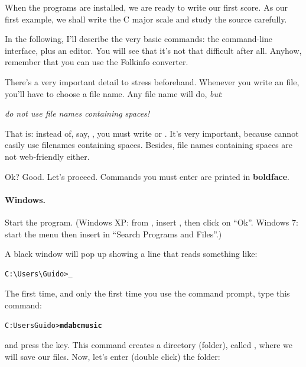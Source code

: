 \documentclass[a4paper,fullpage,12pt]{book}
\begin{document}
When the programs are installed, we are ready to write our first
score. As our first example, we shall write the C major scale and
study the source carefully.

In the following, I'll describe the very basic commands: the
command-line interface, plus an editor. You will see that it's not
that difficult after all. Anyhow, remember that you can use the
Folkinfo converter.

There's a very important detail to stress beforehand. Whenever you
write an \ABC{} file, you'll have to choose a file name. Any file name
will do, \emph{but}:

\begin{vimp}

  \emph{do not use file names containing spaces!}

\end{vimp}

That is: instead of, say, , you must write
 or . It's
very important, because \abcm{} cannot easily use filenames containing
spaces. Besides, file names containing spaces are not web-friendly
either.

Ok? Good. Let's proceed. Commands you must enter are printed in
\textbf{boldface}.


\paragraph{Windows.}

Start the  program. (Windows XP: from
, insert , then click on ``Ok''.
Windows 7: start the menu then insert  in ``Search Programs
and Files''.)

A black window will pop up showing a line that reads something like:

\begin{verbatim}
C:\Users\Guido>_
\end{verbatim}

The first time, and only the first time you use the command prompt,
type this command:

\begin{alltt}
C:\bl{}Users\bl{}Guido>\textbf{md abcmusic}
\end{alltt}

and press the  key. This command creates a directory
(folder), called , where we will save our \ABC{} files.
Now, let's enter (double click) the folder:
\end{document}

